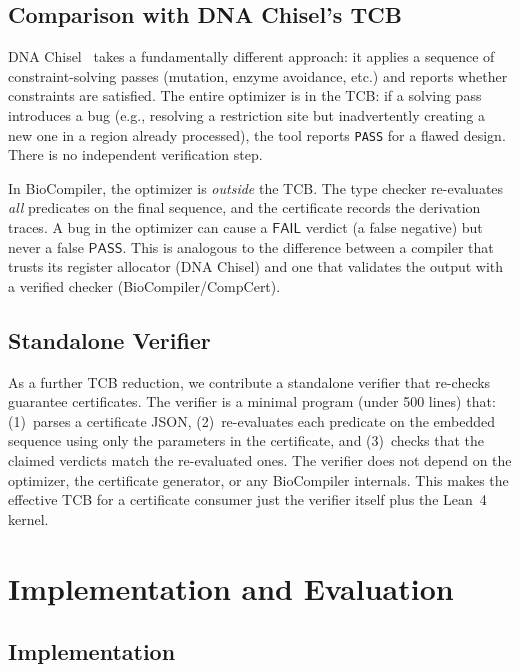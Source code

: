 \documentclass[runningheads]{llncs}
\newcommand{\PASS}{\ensuremath{\mathsf{PASS}}\xspace}
\newcommand{\FAIL}{\ensuremath{\mathsf{FAIL}}\xspace}
\begin{document}
\subsection{Comparison with DNA Chisel's TCB}

DNA Chisel~\cite{piret2020dnachisel} takes a fundamentally different approach: it applies a sequence of constraint-solving passes (mutation, enzyme avoidance, etc.) and reports whether constraints are satisfied.
The entire optimizer is in the TCB: if a solving pass introduces a bug (e.g., resolving a restriction site but inadvertently creating a new one in a region already processed), the tool reports \texttt{PASS} for a flawed design.
There is no independent verification step.

In BioCompiler, the optimizer is \emph{outside} the TCB.
The type checker re-evaluates \emph{all} predicates on the final sequence, and the certificate records the derivation traces.
A bug in the optimizer can cause a \FAIL{} verdict (a false negative) but never a false \PASS.
This is analogous to the difference between a compiler that trusts its register allocator (DNA Chisel) and one that validates the output with a verified checker (BioCompiler/CompCert).

\subsection{Standalone Verifier}

As a further TCB reduction, we contribute a standalone verifier that re-checks guarantee certificates.
The verifier is a minimal program (under 500 lines) that:
(1)~parses a certificate JSON,
(2)~re-evaluates each predicate on the embedded sequence using only the parameters in the certificate, and
(3)~checks that the claimed verdicts match the re-evaluated ones.
The verifier does not depend on the optimizer, the certificate generator, or any BioCompiler internals.
This makes the effective TCB for a certificate consumer just the verifier itself plus the Lean~4 kernel.

\section{Implementation and Evaluation}\label{sec:eval}

\subsection{Implementation}
\end{document}
